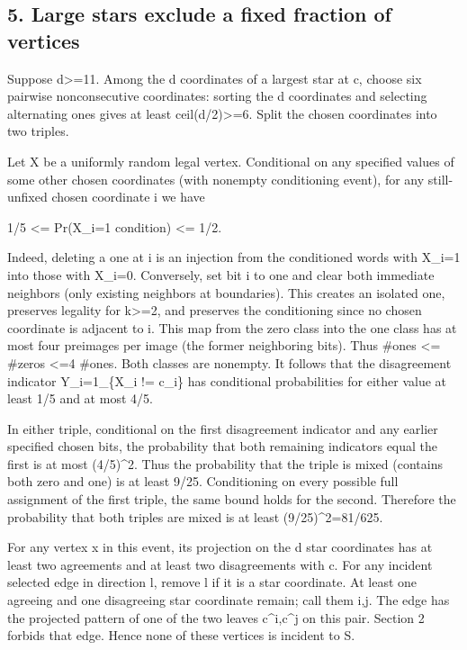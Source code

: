 \documentclass[
  11pt,
]{article}
\begin{document}
\subsection{5. Large stars exclude a fixed fraction of
vertices}\label{5-large-stars-exclude-a-fixed-fraction-of-vertices}

Suppose d\textgreater=11. Among the d coordinates of a largest star at
c, choose six pairwise nonconsecutive coordinates: sorting the d
coordinates and selecting alternating ones gives at least
ceil(d/2)\textgreater=6. Split the chosen coordinates into two triples.

Let X be a uniformly random legal vertex. Conditional on any specified
values of some other chosen coordinates (with nonempty conditioning
event), for any still-unfixed chosen coordinate i we have

1/5 \textless= Pr(X\_i=1 \textbar{} condition) \textless= 1/2.

Indeed, deleting a one at i is an injection from the conditioned words
with X\_i=1 into those with X\_i=0. Conversely, set bit i to one and
clear both immediate neighbors (only existing neighbors at boundaries).
This creates an isolated one, preserves legality for k\textgreater=2,
and preserves the conditioning since no chosen coordinate is adjacent to
i. This map from the zero class into the one class has at most four
preimages per image (the former neighboring bits). Thus \#ones
\textless= \#zeros \textless=4 \#ones. Both classes are nonempty. It
follows that the disagreement indicator Y\_i=1\_\{X\_i != c\_i\} has
conditional probabilities for either value at least 1/5 and at most 4/5.

In either triple, conditional on the first disagreement indicator and
any earlier specified chosen bits, the probability that both remaining
indicators equal the first is at most (4/5)\^{}2. Thus the probability
that the triple is mixed (contains both zero and one) is at least 9/25.
Conditioning on every possible full assignment of the first triple, the
same bound holds for the second. Therefore the probability that both
triples are mixed is at least (9/25)\^{}2=81/625.

For any vertex x in this event, its projection on the d star coordinates
has at least two agreements and at least two disagreements with c. For
any incident selected edge in direction l, remove l if it is a star
coordinate. At least one agreeing and one disagreeing star coordinate
remain; call them i,j. The edge has the projected pattern of one of the
two leaves c\^{}i,c\^{}j on this pair. Section 2 forbids that edge.
Hence none of these vertices is incident to S.
\end{document}
